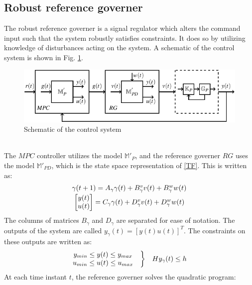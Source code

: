\documentclass[letterpaper, 10 pt, conference]{ieeeconf}  %
\begin{document}
\begin{enumerate}
	\section{Robust reference governer}
	The robust reference governer is a signal regulator which alters the command input such that the system robustly satisfies constraints. It does so by utilizing knowledge of disturbances acting on the system. A schematic of the control system is shown in Fig. \ref{fullloop}. 
	\begin{figure}[h]
		\includegraphics[scale = 0.8]{withRG.pdf}
		\caption{Schematic of the control system}
		\label{fullloop}
	\end{figure} \\
	The $MPC$ controller utilizes the model $\mathbb{M}'_{P}$, and the reference governer $RG$ uses the model $\mathbb{M}'_{PD}$, which is the state space representation of \eqref{TF}. This is written as:
	\begin{equation*}
	\begin{matrix}
	\gamma(t+1) = A_\gamma\gamma(t) + B^v_\gamma v(t) + B^w_\gamma w(t) \vspace{2pt}\\
	\begin{bmatrix}y(t)\\u(t)\end{bmatrix} = C_\gamma\gamma(t) + D^v_\gamma v(t) + D^w_\gamma w(t)
	\end{matrix}
	\end{equation*}
	The columns of matrices $B_\gamma$ and $D_\gamma$ are separated for ease of notation. The outputs of the system are called $y_{\gamma}(t)=[y(t) u(t)]^T$. The constraints on these outputs are written as: 
	\begin{equation*}
	\begin{matrix}
	\begin{matrix}
	y_{min} \leq y(t) \leq y_{max} \\
	u_{min} \leq u(t) \leq u_{max}
	\end{matrix} & \bigg{\}} & Hy_{\gamma}(t) \leq h
	\end{matrix}
	\end{equation*}
	At each time instant $t$, the reference governer solves the quadratic program:

\end{enumerate}
\end{document}
